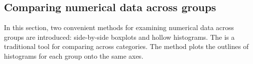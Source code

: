 \begin{doublespace}

\newpage
\subsection{Comparing numerical data across groups}
\label{comparingAcrossGroups}
In this section, two convenient methods for examining numerical data across groups are introduced: side-by-side boxplots and hollow histograms. The   is a traditional tool for comparing across categories. The  method plots the outlines of histograms for each group onto the same axes.


\end{doublespace}
